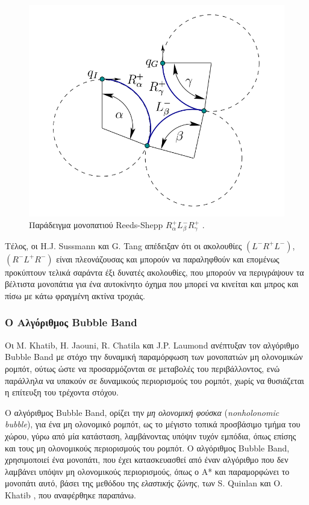 \begin{figure}[!ht]
	\centering
	\includegraphics[width=0.4\linewidth]{Chapters/Chapter3/Figures/reeds_shepp_rlr.png}
	\caption[Παράδειγμα μονοπατιού Reeds-Shepp $R^+_{\alpha}L^-_{\beta}R^+_{\gamma}$.]{Παράδειγμα μονοπατιού Reeds-Shepp $R^+_{\alpha}L^-_{\beta}R^+_{\gamma}$ \cite{planning_algorithms}.}
	\label{fig:reeds_shepp_rlr}
\end{figure}

\bigskip
Τέλος, οι H.J. Sussmann και G. Tang \cite{reeds_shepp_46} απέδειξαν ότι οι ακολουθίες $ (L^-R^+L^-)$, $(R^-L^+R^-)$ είναι πλεονάζουσας και μπορούν να παραληφθούν και επομένως προκύπτουν τελικά σαράντα έξι δυνατές ακολουθίες, που μπορούν να περιγράψουν τα βέλτιστα μονοπάτια για ένα αυτοκίνητο όχημα που μπορεί να κινείται και μπρος και πίσω με κάτω φραγμένη ακτίνα τροχιάς.


\subsubsection{Ο Αλγόριθμος Bubble Band} \label{sssec:bubble_band}
Οι M. Khatib, H. Jaouni, R. Chatila και J.P. Laumond \cite{dpm} ανέπτυξαν τον αλγόριθμο Bubble Band με στόχο την δυναμική παραμόρφωση των μονοπατιών μη ολονομικών ρομπότ, ούτως ώστε να προσαρμόζονται σε μεταβολές του περιβάλλοντος, ενώ παράλληλα να υπακούν σε δυναμικούς περιορισμούς του ρομπότ, χωρίς να θυσιάζεται η επίτευξη του τρέχοντα στόχου.

\bigskip
Ο αλγόριθμος Bubble Band, ορίζει την \textit{μη ολονομική φούσκα} (\textit{nonholonomic bubble}), για ένα μη ολονομικό ρομπότ, ως το μέγιστο τοπικά προσβάσιμο τμήμα του χώρου, γύρω από μία κατάσταση, λαμβάνοντας υπόψιν τυχόν εμπόδια, όπως επίσης και τους μη ολονομικούς περιορισμούς του ρομπότ. Ο αλγόριθμος Bubble Band, χρησιμοποιεί ένα μονοπάτι, που έχει κατασκευασθεί από έναν αλγόριθμο που δεν λαμβάνει υπόψιν μη ολονομικούς περιορισμούς, όπως ο Α* και παραμορφώνει το μονοπάτι αυτό, βάσει της μεθόδου της \textit{ελαστικής ζώνης}, των S. Quinlan και O. Khatib \cite{eband}, που αναφέρθηκε παραπάνω.

